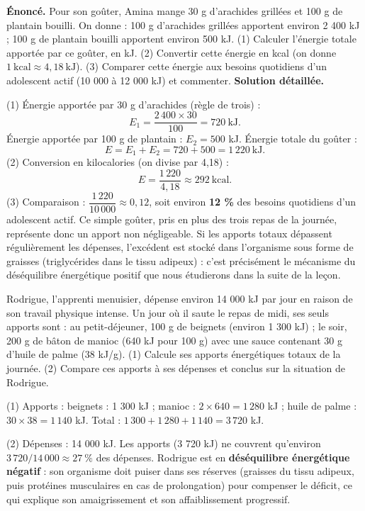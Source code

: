 \documentclass[11pt]{article}
\begin{document}
\begin{exoresolu}
\textbf{Énoncé.} Pour son goûter, Amina mange 30 g d'arachides grillées et 100 g de plantain bouilli. On donne : 100 g d'arachides grillées apportent environ 2 400 kJ ; 100 g de plantain bouilli apportent environ 500 kJ. (1) Calculer l'énergie totale apportée par ce goûter, en kJ. (2) Convertir cette énergie en kcal (on donne $1~\text{kcal} \approx 4{,}18~\text{kJ}$). (3) Comparer cette énergie aux besoins quotidiens d'un adolescent actif (10 000 à 12 000 kJ) et commenter.
\tcblower
\textbf{Solution détaillée.}\par
(1) Énergie apportée par 30 g d'arachides (règle de trois) :
\[ E_1 = \frac{2\,400 \times 30}{100} = 720~\text{kJ}. \]
Énergie apportée par 100 g de plantain : $E_2 = 500$ kJ. Énergie totale du goûter :
\[ E = E_1 + E_2 = 720 + 500 = 1\,220~\text{kJ}. \]
(2) Conversion en kilocalories (on divise par 4,18) :
\[ E = \frac{1\,220}{4{,}18} \approx 292~\text{kcal}. \]
(3) Comparaison : $\dfrac{1\,220}{10\,000} \approx 0{,}12$, soit environ \textbf{12 \%} des besoins quotidiens d'un adolescent actif. Ce simple goûter, pris en plus des trois repas de la journée, représente donc un apport non négligeable. Si les apports totaux dépassent régulièrement les dépenses, l'excédent est stocké dans l'organisme sous forme de graisses (triglycérides dans le tissu adipeux) : c'est précisément le mécanisme du déséquilibre énergétique positif que nous étudierons dans la suite de la leçon.
\end{exoresolu}

\begin{exercice}
Rodrigue, l'apprenti menuisier, dépense environ 14 000 kJ par jour en raison de son travail physique intense. Un jour où il saute le repas de midi, ses seuls apports sont : au petit-déjeuner, 100 g de beignets (environ 1 300 kJ) ; le soir, 200 g de bâton de manioc (640 kJ pour 100 g) avec une sauce contenant 30 g d'huile de palme (38 kJ/g). (1) Calcule ses apports énergétiques totaux de la journée. (2) Compare ces apports à ses dépenses et conclus sur la situation de Rodrigue.
\end{exercice}

\begin{corrige}[Exercice]
(1) Apports : beignets : 1 300 kJ ; manioc : $2 \times 640 = 1\,280$ kJ ; huile de palme : $30 \times 38 = 1\,140$ kJ. Total : $1\,300 + 1\,280 + 1\,140 = 3\,720$ kJ.\par
(2) Dépenses : 14 000 kJ. Les apports (3 720 kJ) ne couvrent qu'environ $3\,720/14\,000 \approx 27~\%$ des dépenses. Rodrigue est en \textbf{déséquilibre énergétique négatif} : son organisme doit puiser dans ses réserves (graisses du tissu adipeux, puis protéines musculaires en cas de prolongation) pour compenser le déficit, ce qui explique son amaigrissement et son affaiblissement progressif.
\end{corrige}
\end{document}
